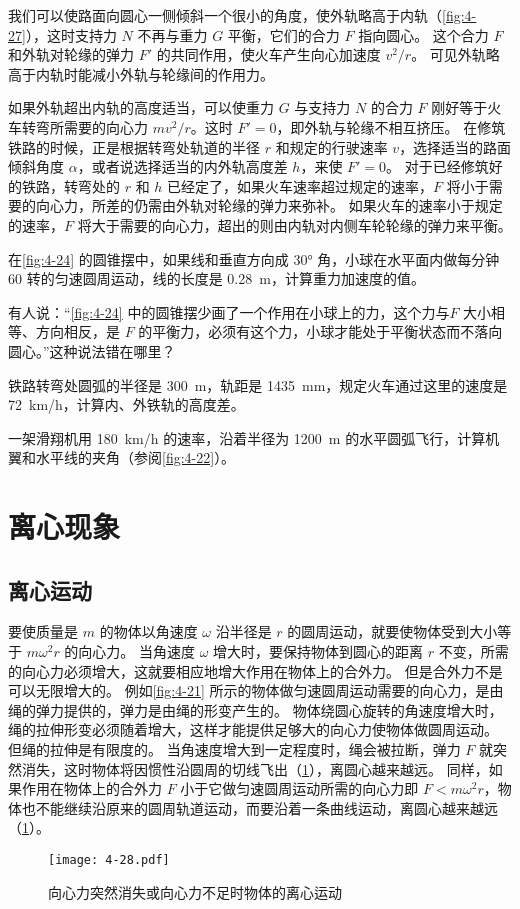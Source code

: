 我们可以使路面向圆心一侧倾斜一个很小的角度，使外轨略高于内轨（\cref{fig:4-27}），这时支持力 $N$ 不再与重力 $G$ 平衡，它们的合力 $F$ 指向圆心。
这个合力 $F$ 和外轨对轮缘的弹力 $F'$ 的共同作用，使火车产生向心加速度 $v^2/r$。
可见外轨略高于内轨时能减小外轨与轮缘间的作用力。

如果外轨超出内轨的高度适当，可以使重力 $G$ 与支持力 $N$ 的合力 $F$ 刚好等于火车转弯所需要的向心力 $mv^2/r$。这时 $F'=0$，即外轨与轮缘不相互挤压。
在修筑铁路的时候，正是根据转弯处轨道的半径 $r$ 和规定的行驶速率 $v$，选择适当的路面倾斜角度 $\alpha$，或者说选择适当的内外轨高度差 $h$，来使 $F'=0$。
对于已经修筑好的铁路，转弯处的 $r$ 和 $h$ 已经定了，如果火车速率超过规定的速率，$F$ 将小于需要的向心力，所差的仍需由外轨对轮缘的弹力来弥补。
如果火车的速率小于规定的速率，$F$ 将大于需要的向心力，超出的则由内轨对内侧车轮轮缘的弹力来平衡。

\begin{Practice}
\begin{question}
	\item 在\cref{fig:4-24} 的圆锥摆中，如果线和垂直方向成 \ang{30} 角，小球在水平面内做每分钟 60 转的匀速圆周运动，线的长度是 \qty{0.28}{m}，计算重力加速度的值。
\item 有人说：“\cref{fig:4-24} 中的圆锥摆少画了一个作用在小球上的力，这个力与$F$ 大小相等、方向相反，是 $F$ 的平衡力，必须有这个力，小球才能处于平衡状态而不落向圆心。”这种说法错在哪里？
\item 铁路转弯处圆弧的半径是 \qty{300}{m}，轨距是 \qty{1435}{mm}，规定火车通过这里的速度是 \qty{72}{km/h}，计算内、外铁轨的高度差。
\item 一架滑翔机用 \qty{180}{km/h} 的速率，沿着半径为 \qty{1200}{m} 的水平圆弧飞行，计算机翼和水平线的夹角（参阅\cref{fig:4-22}）。
\end{question}
\end{Practice}

\section{离心现象}
\subsection{离心运动} 
要使质量是 $m$ 的物体以角速度 $\omega$ 沿半径是 $r$ 的圆周运动，就要使物体受到大小等于 $m\omega^2r$ 的向心力。
当角速度 $\omega$ 增大时，要保持物体到圆心的距离 $r$ 不变，所需的向心力必须增大，这就要相应地增大作用在物体上的合外力。
但是合外力不是可以无限增大的。
例如\cref{fig:4-21} 所示的物体做匀速圆周运动需要的向心力，是由绳的弹力提供的，弹力是由绳的形变产生的。
物体绕圆心旋转的角速度增大时，绳的拉伸形变必须随着增大，这样才能提供足够大的向心力使物体做圆周运动。
但绳的拉伸是有限度的。
当角速度增大到一定程度时，绳会被拉断，弹力 $F$ 就突然消失，这时物体将因惯性沿圆周的切线飞出（\cref{fig:4-28}），离圆心越来越远。
同样，如果作用在物体上的合外力 $F$ 小于它做匀速圆周运动所需的向心力即 $F<m\omega^2 r$，物体也不能继续沿原来的圆周轨道运动，而要沿着一条曲线运动，离圆心越来越远（\cref{fig:4-28}）。
\begin{figure}
  \texttt{[image: 4-28.pdf]}
  \caption{向心力突然消失或向心力不足时物体的离心运动}\label{fig:4-28}
\end{figure}

